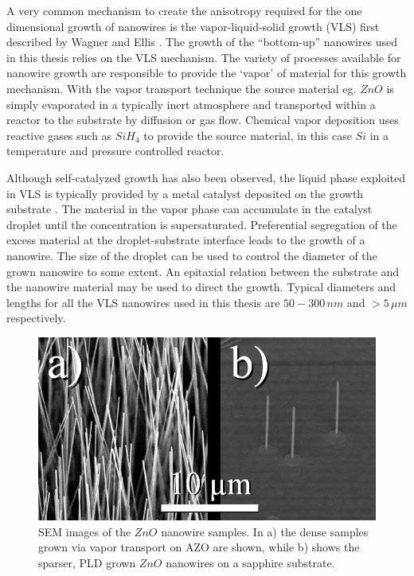 A very common mechanism to create the anisotropy required for the one dimensional growth of nanowires is the vapor-liquid-solid growth (VLS) first described by Wagner and Ellis \cite{wagner_vapor-liquid-solid_1964}. The growth of the ``bottom-up'' nanowires used in this thesis relies on the VLS mechanism. The variety of processes available for nanowire growth are responsible to provide the `vapor' of material for this growth mechanism. With the vapor transport technique the source material eg. $ZnO$ is simply evaporated in a typically inert atmosphere and transported within a reactor to the substrate by diffusion or gas flow. Chemical vapor deposition uses reactive gases such as $SiH_4$ to provide the source material, in this case $Si$ in a temperature and pressure controlled reactor. 


Although self-catalyzed growth has also been observed, the liquid phase exploited in VLS is typically provided by a metal catalyst deposited on the growth substrate \cite{duan_general_2000,wacaser_preferential_2009}. The material in the vapor phase can accumulate in the catalyst droplet until the concentration is supersaturated. Preferential segregation of the excess material at the droplet-substrate interface leads to the growth of a nanowire. The size of the droplet can be used to control the diameter of the grown nanowire to some extent. An epitaxial relation between the substrate and the nanowire material may be used to direct the growth. Typical diameters and lengths for all the VLS nanowires used in this thesis are $50 - 300\,nm$ and $> 5\,\mu m$ respectively. 

\begin{figure}
	\centering
		\includegraphics[width=.5\textwidth]{images/ZnOnanowires.jpg}
	\caption{SEM images of the $ZnO$ nanowire samples. In a) the dense samples grown via vapor transport on AZO are shown, while b) shows the sparser, PLD grown $ZnO$ nanowires on a sapphire substrate.}
	\label{ZnOnanowires}
\end{figure} 

